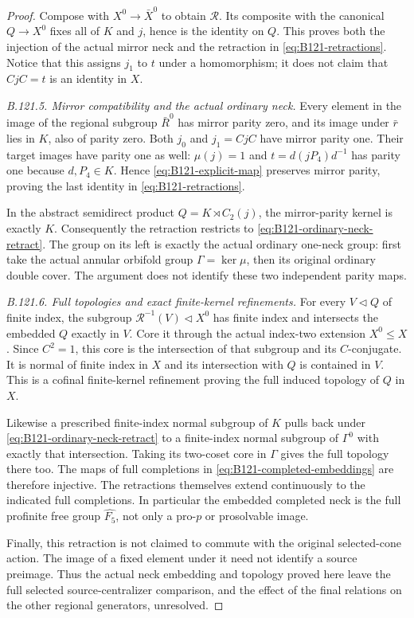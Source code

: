 \begin{proof}
Compose with $X^0\to\bar X^0$ to obtain $\mathcal R$.
Its composite with the canonical $Q\to X^0$ fixes all of $K$
and $j$, hence is the identity on $Q$. This proves both the
injection of the actual mirror neck and the retraction in
\eqref{eq:B121-retractions}. Notice that this assigns $j_1$
to $t$ under a homomorphism; it does not claim that
$CjC=t$ is an identity in $X$.

\emph{B.121.5. Mirror compatibility and the actual ordinary neck.}
Every element in the image of the regional subgroup $\bar R^0$
has mirror parity zero, and its image under $\bar r$ lies in $K$,
also of parity zero. Both $j_0$ and $j_1=CjC$ have mirror
parity one. Their target images have parity one as well:
$\mu(j)=1$ and $t=d(jP_4)d^{-1}$ has parity one because
$d,P_4\in K$. Hence \eqref{eq:B121-explicit-map} preserves
mirror parity, proving the last identity in
\eqref{eq:B121-retractions}.

In the abstract semidirect product $Q=K\rtimes C_2(j)$, the
mirror-parity kernel is exactly $K$. Consequently the retraction
restricts to \eqref{eq:B121-ordinary-neck-retract}. The group
on its left is exactly the actual ordinary one-neck group:
first take the actual annular orbifold group $\Gamma=\ker\mu$,
then its original ordinary double cover. The argument does not
identify these two independent parity maps.

\emph{B.121.6. Full topologies and exact finite-kernel refinements.}
For every $V\lhd Q$ of finite index, the subgroup
$\mathcal R^{-1}(V)\lhd X^0$ has finite index and intersects
the embedded $Q$ exactly in $V$. Core it through the actual
index-two extension $X^0\leq X$. Since $C^2=1$, this core is
the intersection of that subgroup and its $C$-conjugate. It is
normal of finite index in $X$ and its intersection with $Q$ is
contained in $V$. This is a cofinal finite-kernel refinement
proving the full induced topology of $Q$ in $X$.

Likewise a prescribed finite-index normal subgroup of $K$ pulls
back under \eqref{eq:B121-ordinary-neck-retract} to a finite-index
normal subgroup of $\Gamma^0$ with exactly that intersection.
Taking its two-coset core in $\Gamma$ gives the full topology
there too. The maps of full completions in
\eqref{eq:B121-completed-embeddings} are therefore injective.
The retractions themselves extend continuously to the indicated
full completions. In particular the embedded completed neck is
the full profinite free group $\widehat{F_5}$, not only a
pro-$p$ or prosolvable image.

Finally, this retraction is not claimed to commute with the
original selected-cone action. The image of a fixed element
under it need not identify a source preimage. Thus the actual
neck embedding and topology proved here leave the full selected
source-centralizer comparison, and the effect of the final
relations on the other regional generators, unresolved.
\end{proof}
